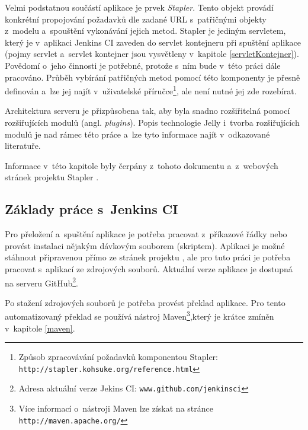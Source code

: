             Velmi podstatnou součástí aplikace je prvek \emph{Stapler}. Tento objekt
            provádí konkrétní propojování požadavků dle zadané URL s~patřičnými objekty
            z~modelu a~spouštění vykonávání jejich metod. Stapler je
            jediným servletem, který je v~aplikaci Jenkins CI zaveden do
            servlet kontejneru při spuštění aplikace (pojmy servlet a~servlet kontejner 
            jsou vysvětleny v~kapitole \ref{servletKontejner}).
            Povědomí o~jeho
            činnosti je potřebné, protože s~ním bude v~této práci dále pracováno.
            Průběh vybírání patřičných metod pomocí této komponenty je přesně
            definován a~lze jej najít v~uživatelské příručce\footnote{
                Způsob zpracovávání požadavků komponentou Stapler:
                \texttt{http://stapler.kohsuke.org/reference.html}}, 
                ale není nutné jej zde rozebírat.

            Architektura serveru je přizpůsobena tak, aby byla snadno rozšiřitelná
            pomocí rozšiřujících modulů (angl. \emph{plugins}). Popis technologie Jelly
            i~tvorba rozšiřujících modulů je nad rámec této práce a~lze tyto informace
            najít v~odkazované literatuře.
        
            Informace v~této kapitole byly čerpány z~tohoto dokumentu \cite{architectureOverview}
            a~z~webových stránek projektu Stapler \cite{staplerWeb}.

        \subsection{Základy práce s~Jenkins CI} \label{jenkinsUsage}
            Pro přeložení a~spuštění aplikace je potřeba pracovat z~příkazové řádky nebo provést instalaci nějakým dávkovým souborem (skriptem).
            Aplikaci je možné stáhnout připravenou přímo ze stránek projektu \cite{jenkinsWeb}, ale pro tuto práci je potřeba 
            pracovat s~aplikací ze zdrojových souborů. Aktuální verze aplikace je dostupná na serveru 
            GitHub\footnote{Adresa aktuální verze Jekins CI: \texttt{www.github.com/jenkinsci}}.

            Po stažení zdrojových souborů je potřeba provést překlad aplikace. Pro tento automatizovaný 
            překlad se používá nástroj Maven\footnote{Více informací o~nástroji Maven lze získat na stránce 
            \texttt{http://maven.apache.org/}},který je krátce zmíněn v~kapitole \ref{maven}. 
            

